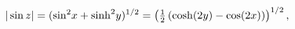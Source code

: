 \[|\mathop{\sin\/}\nolimits z|=({\mathop{\sin\/}\nolimits^{2}}x+{\mathop{\sinh\/%
}\nolimits^{2}}y)^{1/2}=\left(\tfrac{1}{2}\left(\mathop{\cosh\/}\nolimits\!%
\left(2y\right)-\mathop{\cos\/}\nolimits\!\left(2x\right)\right)\right)^{1/2},\]